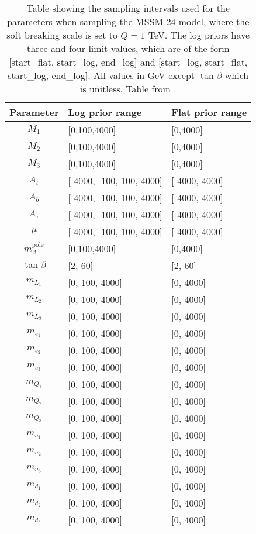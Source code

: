 \documentclass[twoside,english]{uiofysmaster}
\begin{document}
\begin{table}
\centering
\begin{tabular}{cll}
\hline
Parameter & Log prior range & Flat prior range\\
\hline
$M_1$ & [0,100,4000] & [0,4000]\\
$M_2$ & [0,100,4000] & [0,4000]\\
$M_3$ & [0,100,4000] & [0,4000]\\
$A_t$ & [-4000, -100, 100, 4000] & [-4000, 4000]\\
$A_b$ & [-4000, -100, 100, 4000] & [-4000, 4000]\\
$A_{\tau}$ & [-4000, -100, 100, 4000] & [-4000, 4000]\\
$\mu$ & [-4000, -100, 100, 4000] & [-4000, 4000]\\
$m_A^{\text{pole}}$ & [0,100,4000] & [0,4000]\\
$\tan \beta$ & [2, 60] & [2, 60]\\
$m_{L_1}$ & [0, 100, 4000] & [0, 4000]\\
$m_{L_2}$ & [0, 100, 4000] & [0, 4000]\\
$m_{L_3}$ & [0, 100, 4000] & [0, 4000]\\
$m_{e_1}$ & [0, 100, 4000] & [0, 4000]\\
$m_{e_2}$ & [0, 100, 4000] & [0, 4000]\\
$m_{e_3}$ & [0, 100, 4000] & [0, 4000]\\
$m_{Q_1}$ & [0, 100, 4000] & [0, 4000]\\
$m_{Q_2}$ & [0, 100, 4000] & [0, 4000]\\
$m_{Q_3}$ & [0, 100, 4000] & [0, 4000]\\
$m_{u_1}$ & [0, 100, 4000] & [0, 4000]\\
$m_{u_2}$ & [0, 100, 4000] & [0, 4000]\\
$m_{u_3}$ & [0, 100, 4000] & [0, 4000]\\
$m_{d_1}$ & [0, 100, 4000] & [0, 4000]\\
$m_{d_2}$ & [0, 100, 4000] & [0, 4000]\\
$m_{d_3}$ & [0, 100, 4000] & [0, 4000]\\
\end{tabular}
\caption{Table showing the sampling intervals used for the parameters when sampling the MSSM-24 model, where the soft breaking scale is set to $Q = 1$ TeV. The log priors have three and four limit values, which are of the form [start\_flat, start\_log, end\_log] and [start\_log, start\_flat, start\_log, end\_log]. All values in GeV except $\tan \beta$ which is unitless. Table from \cite{sparre2018fast}.}
\label{Tab:: evalualting cross : Feature distributions }
\end{table}
\end{document}
